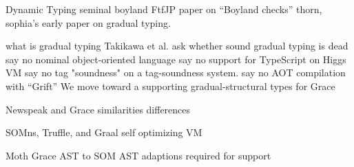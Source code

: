 \begin{outline}

\1 Dynamic Typing
    \2 seminal 
        \3 boyland FtfJP paper on ``Boyland checks''
        \3 thorn, sophia's early paper on gradual typing.

    \2 what is gradual typing
    \2 Takikawa et al. \cite{Takikawa2016} ask whether sound gradual typing is dead
    \2 \cite{Muehlboeck2017} say no
        \3 nominal object-oriented language
    \2 \cite{Richards2017} say no
        \3 support for TypeScript on Higgs VM
    \2 \cite{Greenman2017} say no
        \3 tag "soundness" on a tag-soundness system.
    \2 \cite{Kuhlenschmidt2018} say no
        \3 AOT compilation with ``Grift''
    \2 We move toward a supporting gradual-structural types for Grace

\1 Newspeak and Grace
    \2 similarities
    \2 differences

\1 SOMns, Truffle, and Graal
    \2 self optimizing VM
    \2 \cite{Wurthinger2013}

\1 Moth
    \2 Grace AST to SOM AST
    \2 adaptions required for support
    \2 \cite{Roberts2017}


\end{outline}
